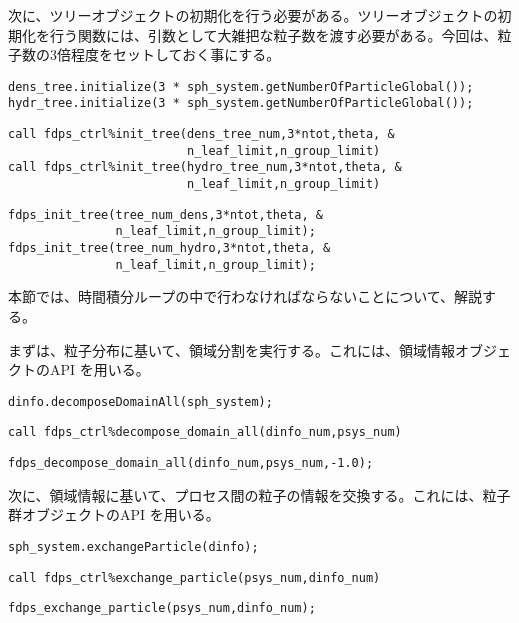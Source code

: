 次に、ツリーオブジェクトの初期化を行う必要がある。ツリーオブジェクトの初期化を行う関数には、引数として大雑把な粒子数を渡す必要がある。今回は、粒子数の3倍程度をセットしておく事にする。
\ifCpp %
\begin{lstlisting}[caption=相互作用ツリークラスの初期化]
dens_tree.initialize(3 * sph_system.getNumberOfParticleGlobal());
hydr_tree.initialize(3 * sph_system.getNumberOfParticleGlobal());
\end{lstlisting}
\endifCpp
\ifFtn %
\begin{lstlisting}[caption=相互作用ツリークラスの初期化]
call fdps_ctrl%init_tree(dens_tree_num,3*ntot,theta, &
                         n_leaf_limit,n_group_limit)
call fdps_ctrl%init_tree(hydro_tree_num,3*ntot,theta, &
                         n_leaf_limit,n_group_limit)
\end{lstlisting}
\endifFtn
\ifC %
\begin{lstlisting}[caption=相互作用ツリークラスの初期化]
fdps_init_tree(tree_num_dens,3*ntot,theta, &
               n_leaf_limit,n_group_limit);
fdps_init_tree(tree_num_hydro,3*ntot,theta, &
               n_leaf_limit,n_group_limit);
\end{lstlisting}
\endifC

本節では、時間積分ループの中で行わなければならないことについて、解説する。

まずは、粒子分布に基いて、領域分割を実行する。これには、領域情報オブジェクトのAPI \decomposeDomainAll を用いる。
\ifCpp %
\begin{lstlisting}[caption=領域分割の実行]
dinfo.decomposeDomainAll(sph_system);
\end{lstlisting}
\endifCpp
\ifFtn %
\begin{lstlisting}[caption=領域分割の実行]
call fdps_ctrl%decompose_domain_all(dinfo_num,psys_num)
\end{lstlisting}
\endifFtn
\ifC %
\begin{lstlisting}[caption=領域分割の実行]
fdps_decompose_domain_all(dinfo_num,psys_num,-1.0);
\end{lstlisting}
\endifC

次に、領域情報に基いて、プロセス間の粒子の情報を交換する。これには、粒子群オブジェクトのAPI \exchangeParticle を用いる。
\ifCpp %
\begin{lstlisting}[caption=粒子交換の実行]
sph_system.exchangeParticle(dinfo);
\end{lstlisting}
\endifCpp
\ifFtn %
\begin{lstlisting}[caption=粒子交換の実行]
call fdps_ctrl%exchange_particle(psys_num,dinfo_num)
\end{lstlisting}
\endifFtn
\ifC %
\begin{lstlisting}[caption=粒子交換の実行]
fdps_exchange_particle(psys_num,dinfo_num);
\end{lstlisting}
\endifC

